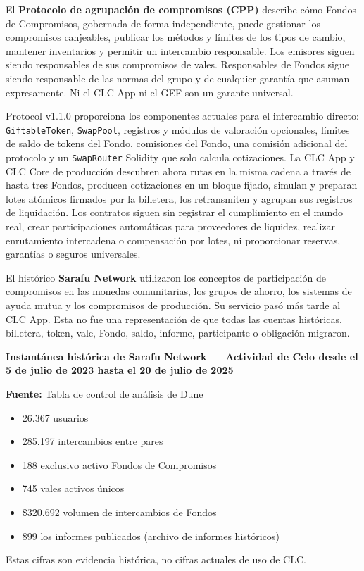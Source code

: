 \documentclass[11pt]{article}
\begin{document}
El \textbf{Protocolo de agrupación de compromisos (CPP)} describe cómo Fondos de Compromisos, gobernada de forma independiente, puede gestionar los compromisos canjeables, publicar los métodos y límites de los tipos de cambio, mantener inventarios y permitir un intercambio responsable. Los emisores siguen siendo responsables de sus compromisos de vales. Responsables de Fondos sigue siendo responsable de las normas del grupo y de cualquier garantía que asuman expresamente. Ni el CLC App ni el GEF son un garante universal.

Protocol v1.1.0 proporciona los componentes actuales para el intercambio directo: \texttt{GiftableToken}, \texttt{SwapPool}, registros y módulos de valoración opcionales, límites de saldo de tokens del Fondo, comisiones del Fondo, una comisión adicional del protocolo y un \texttt{SwapRouter} Solidity que solo calcula cotizaciones. La CLC App y CLC Core de producción descubren ahora rutas en la misma cadena a través de hasta tres Fondos, producen cotizaciones en un bloque fijado, simulan y preparan lotes atómicos firmados por la billetera, los retransmiten y agrupan sus registros de liquidación. Los contratos siguen sin registrar el cumplimiento en el mundo real, crear participaciones automáticas para proveedores de liquidez, realizar enrutamiento intercadena o compensación por lotes, ni proporcionar reservas, garantías o seguros universales.

El histórico \textbf{Sarafu Network} utilizaron los conceptos de participación de compromisos en las monedas comunitarias, los grupos de ahorro, los sistemas de ayuda mutua y los compromisos de producción. Su servicio pasó más tarde al CLC App. Esta no fue una representación de que todas las cuentas históricas, billetera, token, vale, Fondo, saldo, informe, participante o obligación migraron.

\textbf{Instantánea histórica de Sarafu Network --- Actividad de Celo desde el 5 de julio de 2023 hasta el 20 de julio de 2025}

\textbf{Fuente:} \href{https://dune.com/grassrootseconomics/sarafu-network}{Tabla de control de análisis de Dune}

\begin{itemize}[leftmargin=*]
\item 26.367 usuarios
\item 285.197 intercambios entre pares
\item 188 exclusivo activo Fondos de Compromisos
\item 745 vales activos únicos
\item \$320.692 volumen de intercambios de Fondos
\item 899 los informes publicados (\href{https://sarafu.network/reports}{archivo de informes históricos})
\end{itemize}
Estas cifras son evidencia histórica, no cifras actuales de uso de CLC.
\end{document}
